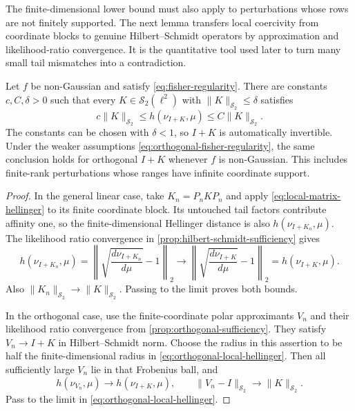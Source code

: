 The finite-dimensional lower bound must also apply to perturbations whose
rows are not finitely supported.
The next lemma transfers local coercivity from coordinate blocks to genuine
Hilbert--Schmidt operators by approximation and likelihood-ratio convergence.
It is the quantitative tool used later to turn many small tail mismatches
into a contradiction.

\begin{lemma}
\label{lem:local-hs-coercivity}
Let $f$ be non-Gaussian and satisfy
\eqref{eq:fisher-regularity}.  There are constants
$c,C,\delta>0$ such that every $K\in\mathcal S_2(\ell^2)$ with
$\|K\|_{\mathcal S_2}\le\delta$ satisfies
\begin{equation}
 c\|K\|_{\mathcal S_2}
 \le h(\nu_{I+K},\mu)
 \le C\|K\|_{\mathcal S_2}.
 \label{eq:local-hs-hellinger}
\end{equation}
The constants can be chosen with $\delta<1$, so $I+K$ is
automatically invertible.  Under the weaker assumptions
\eqref{eq:orthogonal-fisher-regularity}, the same conclusion
holds for orthogonal $I+K$ whenever $f$ is non-Gaussian.
This includes finite-rank perturbations whose ranges have
infinite coordinate support.
\end{lemma}

\begin{proof}
In the general linear case, take $K_n=P_nKP_n$ and apply
\eqref{eq:local-matrix-hellinger} to its finite coordinate
block.  Its untouched tail factors contribute affinity one,
so the finite-dimensional Hellinger distance is also
$h(\nu_{I+K_n},\mu)$.  The likelihood ratio convergence in
\cref{prop:hilbert-schmidt-sufficiency} gives
\[
 h(\nu_{I+K_n},\mu)
 =\left\|\sqrt{\frac{d\nu_{I+K_n}}{d\mu}}-1\right\|_2
 \longrightarrow
 \left\|\sqrt{\frac{d\nu_{I+K}}{d\mu}}-1\right\|_2
 =h(\nu_{I+K},\mu).
\]
Also $\|K_n\|_{\mathcal S_2}\to\|K\|_{\mathcal S_2}$.
Passing to the limit proves both bounds.

In the orthogonal case, use the finite-coordinate polar
approximants $V_n$ and their likelihood ratio convergence from
\cref{prop:orthogonal-sufficiency}.  They satisfy
$V_n\to I+K$ in Hilbert--Schmidt norm.  Choose the radius in
this assertion to be half the finite-dimensional radius in
\eqref{eq:orthogonal-local-hellinger}.  Then all sufficiently
large $V_n$ lie in that Frobenius ball, and
\[
 h(\nu_{V_n},\mu)\longrightarrow h(\nu_{I+K},\mu),
 \qquad
 \|V_n-I\|_{\mathcal S_2}\longrightarrow\|K\|_{\mathcal S_2}.
\]
Pass to the limit in \eqref{eq:orthogonal-local-hellinger}.
\end{proof}


